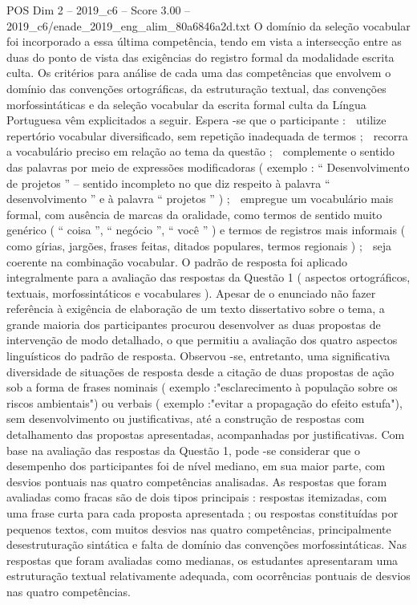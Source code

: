 \begin{textsample}{POS Dim 2 – 2019\_c6 – Score 3.00 – 2019\_c6/enade\_2019\_eng\_alim\_80a6846a2d.txt}
O domínio da seleção vocabular foi incorporado a essa última competência, tendo em vista a intersecção entre as duas do ponto de vista das exigências do registro formal da modalidade escrita culta.
Os critérios para análise de cada uma das competências que envolvem o domínio das convenções ortográficas, da estruturação textual, das convenções morfossintáticas e da seleção vocabular da escrita formal culta da Língua Portuguesa vêm explicitados a seguir.
Espera -se que o participante :  utilize repertório vocabular diversificado, sem repetição inadequada de termos ;  recorra a vocabulário preciso em relação ao tema da questão ;  complemente o sentido das palavras por meio de expressões modificadoras ( exemplo : “ Desenvolvimento de projetos ” – sentido incompleto no que diz respeito à palavra “ desenvolvimento ” e à palavra “ projetos ” ) ;  empregue um vocabulário mais formal, com ausência de marcas da oralidade, como termos de sentido muito genérico ( “ coisa ”, “ negócio ”, “ você ” ) e termos de registros mais informais ( como gírias, jargões, frases feitas, ditados populares, termos regionais ) ;  seja coerente na combinação vocabular.
O padrão de resposta foi aplicado integralmente para a avaliação das respostas da Questão 1 ( aspectos ortográficos, textuais, morfossintáticos e vocabulares ).
Apesar de o enunciado não fazer referência à exigência de elaboração de um texto dissertativo sobre o tema, a grande maioria dos participantes procurou desenvolver as duas propostas de intervenção de modo detalhado, o que permitiu a avaliação dos quatro aspectos linguísticos do padrão de resposta.
Observou -se, entretanto, uma significativa diversidade de situações de resposta desde a citação de duas propostas de ação sob a forma de frases nominais ( exemplo :"esclarecimento à população sobre os riscos ambientais") ou verbais ( exemplo :"evitar a propagação do efeito estufa"), sem desenvolvimento ou justificativas, até a construção de respostas com detalhamento das propostas apresentadas, acompanhadas por justificativas.
Com base na avaliação das respostas da Questão 1, pode -se considerar que o desempenho dos participantes foi de nível mediano, em sua maior parte, com desvios pontuais nas quatro competências analisadas.
As respostas que foram avaliadas como fracas são de dois tipos principais : respostas itemizadas, com uma frase curta para cada proposta apresentada ; ou respostas constituídas por pequenos textos, com muitos desvios nas quatro competências, principalmente desestruturação sintática e falta de domínio das convenções morfossintáticas.
Nas respostas que foram avaliadas como medianas, os estudantes apresentaram uma estruturação textual relativamente adequada, com ocorrências pontuais de desvios nas quatro competências.

\end{textsample}
